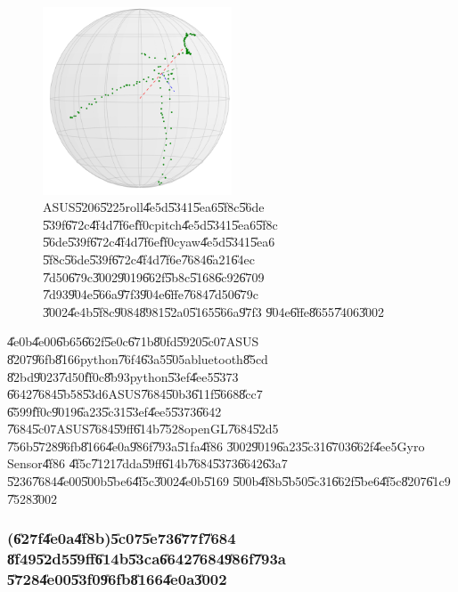 \begin{figure}[th]
\caption{ASUS\U{5206}\U{5225}roll\U{4e5d}\U{5341}\U{5ea6}\U{5f8c}\U{56de}%
\U{539f}\U{672c}\U{4f4d}\U{7f6e}\U{ff0c}pitch\U{4e5d}\U{5341}\U{5ea6}\U{5f8c}%
\U{56de}\U{539f}\U{672c}\U{4f4d}\U{7f6e}\U{ff0c}yaw\U{4e5d}\U{5341}\U{5ea6}%
\U{5f8c}\U{56de}\U{539f}\U{672c}\U{4f4d}\U{7f6e}\U{7684}\U{6a21}\U{64ec}%
\U{7d50}\U{679c}\U{3002}\U{9019}\U{662f}\U{5b8c}\U{5168}\U{6c92}\U{6709}%
\U{7d93}\U{904e}\U{566a}\U{97f3}\U{904e}\U{6ffe}\U{7684}\U{7d50}\U{679c}%
\U{3002}\U{4e4b}\U{5f8c}\U{9084}\U{8981}\U{52a0}\U{5165}\U{566a}\U{97f3}%
\U{904e}\U{6ffe}\U{8655}\U{7406}\U{3002}}
\begin{center}
\includegraphics[width=0.5\textwidth]{./figs/ASUS_test.png}
\end{center}
\end{figure}

\U{4e0b}\U{4e00}\U{6b65}\U{662f}\U{5e0c}\U{671b}\U{80fd}\U{5920}\U{5c07}ASUS%
\U{8207}\U{96fb}\U{8166}python\U{76f4}\U{63a5}\U{505a}bluetooth\U{85cd}%
\U{82bd}\U{9023}\U{7d50}\U{ff0c}\U{8b93}python\U{53ef}\U{4ee5}\U{5373}%
\U{6642}\U{7684}\U{5b58}\U{53d6}ASUS\U{7684}\U{50b3}\U{611f}\U{5668}\U{8cc7}%
\U{6599}\U{ff0c}\U{9019}\U{6a23}\U{5c31}\U{53ef}\U{4ee5}\U{5373}\U{6642}%
\U{7684}\U{5c07}ASUS\U{7684}\U{59ff}\U{614b}\U{7528}openGL\U{7684}\U{52d5}%
\U{756b}\U{5728}\U{96fb}\U{8166}\U{4e0a}\U{986f}\U{793a}\U{51fa}\U{4f86}%
\U{3002}\U{9019}\U{6a23}\U{5c31}\U{6703}\U{662f}\U{4ee5}Gyro Sensor\U{4f86}%
\U{4f5c}\U{7121}\U{7dda}\U{59ff}\U{614b}\U{7684}\U{5373}\U{6642}\U{63a7}%
\U{5236}\U{7684}\U{4e00}\U{500b}\U{5be6}\U{4f5c}\U{3002}\U{4e0b}\U{5169}%
\U{500b}\U{4f8b}\U{5b50}\U{5c31}\U{662f}\U{5be6}\U{4f5c}\U{8207}\U{61c9}%
\U{7528}\U{3002}

\clearpage%

\subsubsection{(\U{627f}\U{4e0a}\U{4f8b})\U{5c07}\U{5e73}\U{677f}\U{7684}%
\U{8f49}\U{52d5}\U{59ff}\U{614b}\U{53ca}\U{6642}\U{7684}\U{986f}\U{793a}%
\U{5728}\U{4e00}\U{53f0}\U{96fb}\U{8166}\U{4e0a}\U{3002}}

